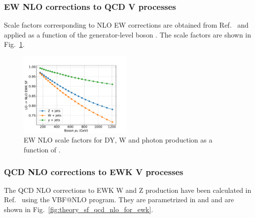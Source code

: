 \subsubsection{EW NLO corrections to QCD V processes}
Scale factors corresponding to NLO EW corrections are obtained from Ref.~\cite{DMTheory} and applied as a function of the generator-level boson \pt. The scale factors are shown in Fig.~\ref{fig:theory_sf_ew_nlo}.

\begin{figure}[ht!]
    \begin{center}
        \includegraphics[width=0.49\textwidth]{fig/theory/nlo_ewk.pdf}
        \caption{
            EW NLO scale factors for DY, W and photon production as a function of \ptv.
          }
      \label{fig:theory_sf_ew_nlo}
    \end{center}
  \end{figure}

\subsubsection{QCD NLO corrections to EWK V processes}
The QCD NLO corrections to EWK W and Z production have been calculated in Ref.~\cite{AN-2017-267} using the VBF@NLO program. They are parametrized in \ptv and \mjj and are shown in Fig.~\ref{fig:theory_sf_qcd_nlo_for_ewk}.


